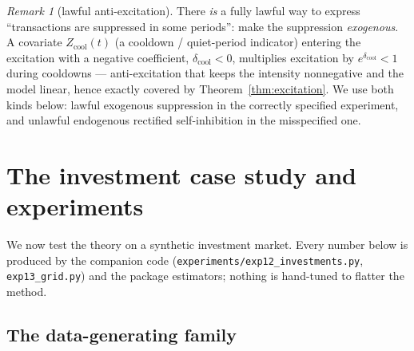 \documentclass[11pt]{article}
\theoremstyle{plain}
\theoremstyle{definition}
\theoremstyle{remark}
\newtheorem*{remark}{Remark}
\newcommand{\code}[1]{\texttt{#1}}
\begin{document}
\begin{remark}[lawful anti-excitation]
There \emph{is} a fully lawful way to express ``transactions are suppressed in
some periods'': make the suppression \emph{exogenous}. A covariate
$Z_{\text{cool}}(t)$ (a cooldown / quiet-period indicator) entering the excitation
with a negative coefficient, $\delta_{\text{cool}}<0$, multiplies excitation by
$e^{\delta_{\text{cool}}}<1$ during cooldowns --- anti-excitation that keeps the
intensity nonnegative and the model linear, hence exactly covered by
Theorem~\ref{thm:excitation}. We use both kinds below: lawful exogenous
suppression in the correctly specified experiment, and unlawful endogenous
rectified self-inhibition in the misspecified one.
\end{remark}

\section{The investment case study and experiments}
\label{sec:experiments}

We now test the theory on a synthetic investment market. Every number below is
produced by the companion code (\code{experiments/exp12\_investments.py},
\code{exp13\_grid.py}) and the package estimators; nothing is hand-tuned to
flatter the method.

\subsection{The data-generating family}
\label{sec:dgp}
\end{document}
